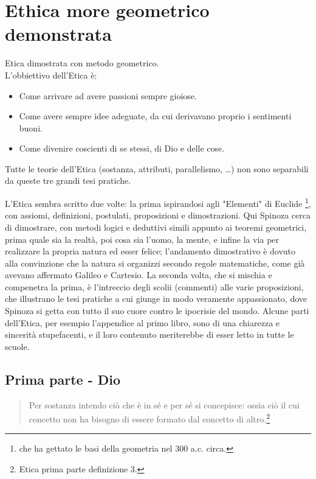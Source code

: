 \chapter[Etica]{Ethica more geometrico demonstrata}
Etica dimostrata con metodo geometrico.\\L'obbiettivo dell'Etica è:\begin{itemize}
	\item Come arrivare ad avere passioni sempre gioiose.
	\item Come avere sempre idee adeguate, da cui derivavano proprio i sentimenti buoni.
	\item Come divenire coscienti di se stessi, di Dio e delle cose.
\end{itemize}

Tutte le teorie dell'Etica (sostanza, attributi, parallelismo, \dots) non sono separabili da queste tre grandi tesi pratiche.

L'Etica sembra scritto due volte: la prima ispirandosi agli "Elementi" di Euclide \footnote{che ha gettato le basi della geometria nel 300 a.c. circa.}, con assiomi, definizioni, postulati, proposizioni e dimostrazioni. Qui Spinoza cerca di dimostrare, con metodi logici e deduttivi simili appunto ai teoremi geometrici, prima quale sia la realtà, poi cosa sia l'uomo, la mente, e infine la via per realizzare la propria natura ed esser felice; l'andamento dimostrativo è dovuto alla convinzione che la natura si organizzi secondo regole matematiche, come già avevano affermato Galileo e Cartesio. La seconda volta, che si mischia e compenetra la prima, è l'intreccio degli scolii (commenti) alle varie proposizioni, che illustrano le tesi pratiche a cui giunge in modo veramente appassionato, dove Spinoza si getta con tutto il suo cuore contro le ipocrisie del mondo. Alcune parti dell'Etica, per esempio l'appendice al primo libro, sono di una chiarezza e sincerità stupefacenti, e il loro contenuto meriterebbe di esser letto in tutte le scuole.
\newpage

\section[Dio]{Prima parte - Dio}
\begin{quotation}
\small	Per sostanza intendo ciò che è in sé e per sé si concepisce: ossia ciò il cui concetto non ha bisogno di essere formato dal concetto di altro.\footnote{Etica prima parte definizione 3.}
\end{quotation}

